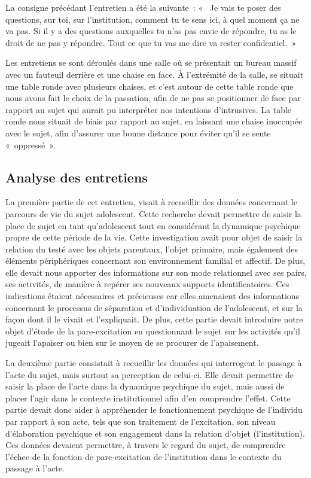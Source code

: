 \documentclass[12pt, a4paper]{book}
\begin{document}
\begin{spacing}{1.5}
La consigne précédant l'entretien a été la suivante : «  Je vais te poser des questions, sur toi, sur l'institution, comment tu te sens ici, à quel moment ça ne va pas. Si il y a des questions auxquelles tu n'as pas envie de répondre, tu as le droit de ne pas y répondre. Tout ce que tu vas me dire va rester confidentiel. »

Les entretiens se sont déroulés dans une salle où se présentait un bureau massif  avec un fauteuil derrière et une chaise en face. À l'extrémité de la salle, se situait une table ronde avec plusieurs chaises, et c'est autour de cette table ronde que nous avons fait le choix de la passation, afin de ne pas se positionner de face par rapport au sujet qui aurait pu interpréter nos intentions d'intrusives. La table ronde nous situait de biais par rapport au sujet, en laissant une chaise inoccupée avec le sujet, afin d'assurer une bonne distance pour éviter qu'il se sente « oppressé ». 

\subsection{Analyse des entretiens}

La première partie de cet entretien, visait à recueillir des données concernant le parcours de vie du sujet adolescent. Cette recherche devait permettre de saisir la place de sujet en tant qu'adolescent tout en considérant la dynamique psychique propre de cette période de la vie. Cette investigation avait pour objet de saisir la relation du testé avec les objets parentaux, l'objet primaire, mais également des éléments périphériques concernant son environnement familial et affectif. De plus, elle devait nous apporter  des informations sur son mode relationnel avec ses pairs, ses activités, de manière à repérer ses nouveaux supports identificatoires. Ces indications étaient nécessaires et précieuses car elles amenaient des informations concernant le processus de séparation et d'individuation de l'adolescent, et sur la façon dont il le vivait et l'expliquait. De plus, cette partie devait introduire notre objet d'étude de la pare-excitation en questionnant le sujet sur les activités qu'il  jugeait l'apaiser ou bien sur le moyen de se procurer de l'apaisement.

La deuxième partie consistait à recueillir les données qui interrogent le passage à l'acte du sujet, mais surtout sa perception de celui-ci. Elle devait permettre de saisir la place de l'acte dans la dynamique psychique du sujet, mais aussi de placer l'agir dans le contexte institutionnel afin d'en comprendre l'effet. Cette partie devait donc aider à appréhender le fonctionnement psychique de l'individu par rapport à son acte, tels que son traitement de l'excitation, son niveau d'élaboration psychique et son engagement dans la relation d'objet (l'institution). Ces données devaient permettre, à travers le regard du sujet, de comprendre l'échec de la fonction de pare-excitation de l'institution dans le contexte du passage à l'acte.


\end{spacing}
\end{document}
